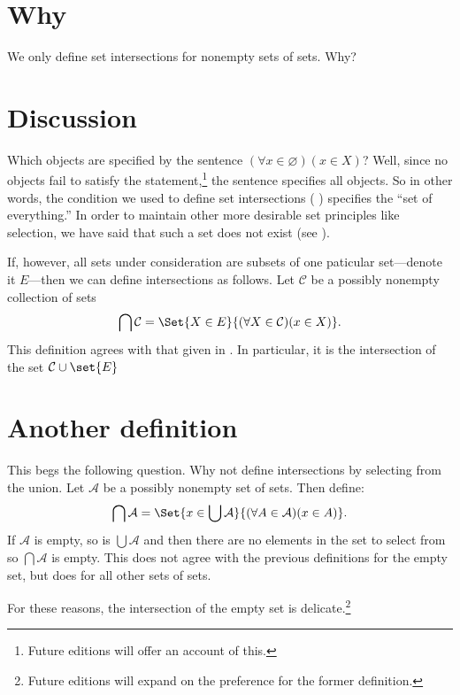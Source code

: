 

\section*{Why}

We only define set intersections for nonempty sets of sets.
Why?

\section*{Discussion}

Which objects are specified by the sentence $(\forall x \in \varnothing)(x \in X)$?
Well, since no objects fail to satisfy the statement,\footnote{Future editions will offer an account of this.}
the sentence specifies all objects.
So in other words, the condition we used to define set intersections ( ) specifies the ``set of everything.''
In order to maintain other more desirable set principles like selection, we have said that such a set does not exist (see ).

If, however, all sets under consideration are subsets of one paticular set---denote it $E$---then we can define intersections as follows.
Let $\mathcal{C} $ be a possibly nonempty collection of sets
\[
\bigcap \mathcal{C}  = \Set{X \in E}{(\forall X \in \mathcal{C} )(x \in X)}.
\]
This definition agrees with that given in .
In particular, it is the intersection of the set $\mathcal{C} \cup \set{E}$

\section*{Another definition}

This begs the following question.
Why not define intersections by selecting from the union.
Let $\mathcal{A} $ be a possibly nonempty set of sets.
Then define:
\[
\bigcap \mathcal{A}  = \Set{x \in \bigcup \mathcal{A} }{(\forall A \in \mathcal{A} )(x \in A)}.
\]
If $\mathcal{A} $ is empty, so is $\bigcup \mathcal{A} $ and then there are no elements in the set to select from so $\bigcap \mathcal{A} $ is empty.
This does not agree with the previous definitions for the empty set, but does for all other sets of sets.

For these reasons, the intersection of the empty set is delicate.\footnote{Future editions will expand on the preference for the former definition.}
